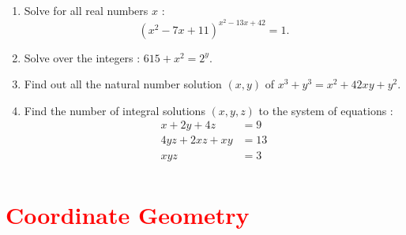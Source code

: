 \documentclass[11pt, a4paper]{article}
\begin{document}
\begin{enumerate}
	\item Solve for all real numbers $x$ :
	$$(x^2 - 7x + 11)^{x^2 - 13x + 42} = 1.$$
	
	\item Solve over the integers : $615 + x^2 = 2^y$.
	
	\item Find out all the natural number solution $(x, y)$ of $x^3 + y^3 = x^2 + 42xy + y^2$.
	
	\item Find the number of integral solutions $(x, y, z)$ to the system of equations :
	\begin{align*}
	x + 2y + 4z &= 9 \\
	4yz + 2xz + xy &= 13 \\
	xyz &= 3 \\
	\end{align*}
	
\end{enumerate}


\section{\textcolor{red}{Coordinate Geometry}}
\end{document}
